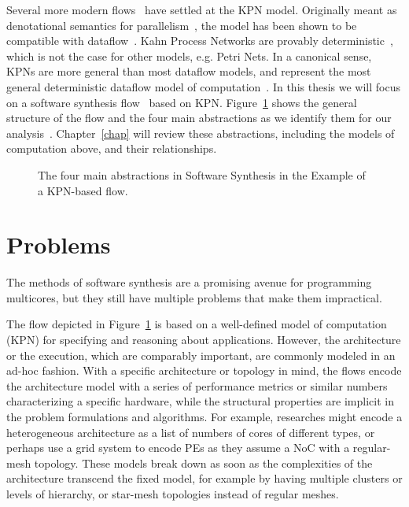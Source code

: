 Several more modern flows~\cite{thiele2007DOL,maps,pimentel2006systematic,kangas2006uml} have settled at the \ac{KPN} model.
Originally meant as denotational semantics for parallelism~\cite{kahn74}, the model has been shown to be compatible with dataflow~\cite{lee1995dataflow}.
Kahn Process Networks are provably deterministic~\cite{kahn74}, which is not the case for other models, e.g. Petri Nets.
In a canonical sense, \acp{KPN} are more general than most dataflow models, and represent the most general deterministic dataflow model of computation~\cite{lee_matsikoudis_semantics}.
In this thesis we will focus on a software synthesis flow~\cite{maps,castrillon2014thesis} based on \ac{KPN}.
Figure~\ref{fig:software_synthesis_flows} shows the general structure of the flow and the four main abstractions as we identify them for our analysis~\cite{goens_mcsoc16}.
Chapter~\ref{chap} will review these abstractions, including the models of computation above, and their relationships.

\begin{figure}[h]
	\centering
   \resizebox{0.75\textwidth}{!}{}
   \caption{The four main abstractions in Software Synthesis in the Example of a \acs{KPN}-based flow.} 
	\label{fig:software_synthesis_flows}
\end{figure}

\section{Problems}

The methods of software synthesis are a promising avenue for programming multicores, but they still have multiple problems that make them impractical.

The flow depicted in Figure~\ref{fig:software_synthesis_flows} is based on a well-defined model of computation (\ac{KPN}) for specifying and reasoning about applications.
However, the architecture or the execution, which are comparably important, are commonly modeled in an ad-hoc fashion.
With a specific architecture or topology in mind, the flows encode the architecture model with a series of performance metrics or similar numbers characterizing a specific hardware, while the structural properties are implicit in the problem formulations and algorithms.
For example, researches might encode a heterogeneous architecture as a list of numbers of cores of different types, or perhaps use a grid system to encode \acp{PE} as they assume a \ac{NoC} with a regular-mesh topology.
These models break down as soon as the complexities of the architecture transcend the fixed model, for example by having multiple clusters or levels of hierarchy, or star-mesh topologies instead of regular meshes.

